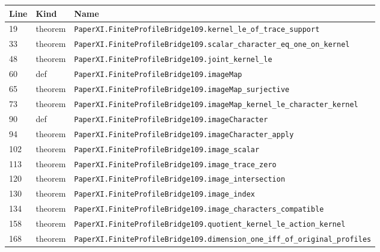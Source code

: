 \documentclass[10pt,oneside]{book}
\begin{document}
\begin{longtable}{@{}p{}p{}p{}@{}}\toprule Line&Kind&Name\\\midrule\endhead

19&theorem&\nolinkurl{PaperXI.FiniteProfileBridge109.kernel_le_of_trace_support}\\

33&theorem&\nolinkurl{PaperXI.FiniteProfileBridge109.scalar_character_eq_one_on_kernel}\\

48&theorem&\nolinkurl{PaperXI.FiniteProfileBridge109.joint_kernel_le}\\

60&def&\nolinkurl{PaperXI.FiniteProfileBridge109.imageMap}\\

65&theorem&\nolinkurl{PaperXI.FiniteProfileBridge109.imageMap_surjective}\\

73&theorem&\nolinkurl{PaperXI.FiniteProfileBridge109.imageMap_kernel_le_character_kernel}\\

90&def&\nolinkurl{PaperXI.FiniteProfileBridge109.imageCharacter}\\

94&theorem&\nolinkurl{PaperXI.FiniteProfileBridge109.imageCharacter_apply}\\

102&theorem&\nolinkurl{PaperXI.FiniteProfileBridge109.image_scalar}\\

113&theorem&\nolinkurl{PaperXI.FiniteProfileBridge109.image_trace_zero}\\

120&theorem&\nolinkurl{PaperXI.FiniteProfileBridge109.image_intersection}\\

130&theorem&\nolinkurl{PaperXI.FiniteProfileBridge109.image_index}\\

134&theorem&\nolinkurl{PaperXI.FiniteProfileBridge109.image_characters_compatible}\\

158&theorem&\nolinkurl{PaperXI.FiniteProfileBridge109.quotient_kernel_le_action_kernel}\\

168&theorem&\nolinkurl{PaperXI.FiniteProfileBridge109.dimension_one_iff_of_original_profiles}\\

\bottomrule\end{longtable}
\end{document}
